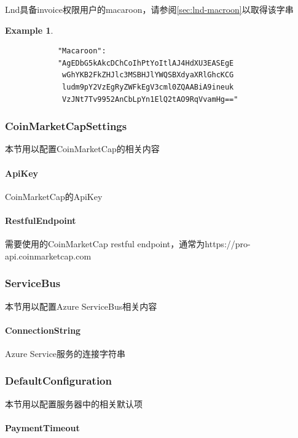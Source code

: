 \documentclass[a4paper,11pt]{article}
\theoremstyle{definition}
\newtheorem{exmp}{Example}[section]
\begin{document}
Lnd具备invoice权限用户的macaroon，请参阅\ref{sec:lnd-macroon}以取得该字串
    \begin{exmp}
        \begin{lstlisting}
            "Macaroon":
            "AgEDbG5kAkcDChCoIhPtYoItlAJ4HdXU3EASEgE
             wGhYKB2FkZHJlc3MSBHJlYWQSBXdyaXRlGhcKCG
             ludm9pY2VzEgRyZWFkEgV3cml0ZQAABiA9ineuk
             VzJNt7Tv9952AnCbLpYn1ElQ2tAO9RqVvamHg=="
        \end{lstlisting}
    \end{exmp}

\subsubsection{CoinMarketCapSettings}
本节用以配置CoinMarketCap的相关内容

\paragraph{ApiKey}


CoinMarketCap的ApiKey

\paragraph{RestfulEndpoint}


需要使用的CoinMarketCap restful endpoint，通常为https://pro-api.coinmarketcap.com

\subsubsection{ServiceBus}

本节用以配置Azure ServiceBus相关内容

\paragraph{ConnectionString}


Azure Service服务的连接字符串

\subsubsection{DefaultConfiguration}
本节用以配置服务器中的相关默认项

\paragraph{PaymentTimeout}
\end{document}
